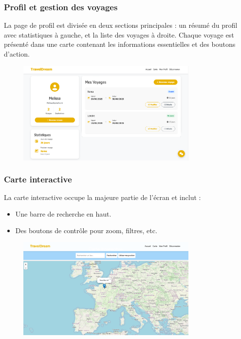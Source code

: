 \documentclass[a4paper,12pt]{article}
\begin{document}
\subsubsection{Profil et gestion des voyages}
La page de profil est divisée en deux sections principales : un résumé du profil avec
statistiques à gauche, et la liste des voyages à droite. Chaque voyage est présenté dans
une carte contenant les informations essentielles et des boutons d'action.
\begin{figure}[H]
    \centering
    \includegraphics[width=0.8\textwidth]{profil.png}
\end{figure}
\subsubsection{Carte interactive}
La carte interactive occupe la majeure partie de l’écran et inclut :
\begin{itemize}
  \item Une barre de recherche en haut.
  \item Des boutons de contrôle pour zoom, filtres, etc.
\end{itemize}
\begin{figure}[H]
    \centering
    \includegraphics[width=0.8\textwidth]{carte.png}
\end{figure}
\end{document}
